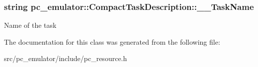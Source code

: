 \subsubsection[{\texorpdfstring{\+\_\+\+\_\+\+Task\+Name}{__TaskName}}]{\setlength{\rightskip}{0pt plus 5cm}string pc\+\_\+emulator\+::\+Compact\+Task\+Description\+::\+\_\+\+\_\+\+Task\+Name}\hypertarget{classpc__emulator_1_1CompactTaskDescription_aa30ec0540777f34e779bb4dea60fb319}{}\label{classpc__emulator_1_1CompactTaskDescription_aa30ec0540777f34e779bb4dea60fb319}
Name of the task 

The documentation for this class was generated from the following file\+:\begin{DoxyCompactItemize}
\item 
src/pc\+\_\+emulator/include/pc\+\_\+resource.\+h\end{DoxyCompactItemize}
